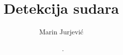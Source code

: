 


%




\frontmatter   %



\title{Detekcija sudara}   %

\date{\MONTH~\the\year.}   %

\author{Marin Jurjević}  %
\maketitle		%
\maketitleabstract
\begin{assignmentpage}
\end{assignmentpage}

\begin{honestystatementpage}
	
\end{honestystatementpage}

\begin{acknowledgments} %
	  
\end{acknowledgments}

\tableofcontents
\listoffigures
\listoftables
\clearpage
{}
\lstlistoflistings

\listofalgorithms




